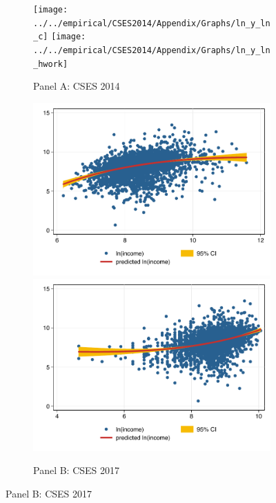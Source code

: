 \documentclass[11pt,letterpaper]{article}
\begin{document}
\begin{figure}[H]
	\caption{Scatter plot of the logarithm of household income ($log(Y_{i})$)}
	
	
	\label{fig:3}
	\begin{subfigure}[b]{0.33\linewidth}
		\caption*{Panel A: CSES 2014} \vspace{-.5em}
		\label{fig:3a}
		\texttt{[image: ../../empirical/CSES2014/Appendix/Graphs/ln\_y\_ln\_c]} 
		\vspace{-2.5em}
		\newline {}
		\texttt{[image: ../../empirical/CSES2014/Appendix/Graphs/ln\_y\_ln\_hwork]} 
		\vspace{-2.5em}
		\newline {}
	\end{subfigure}%
	\hfil
	\begin{subfigure}[b]{0.33\linewidth}
		\caption*{Panel B: CSES 2017} \vspace{-.5em}
		\label{fig:3b}
		\includegraphics[width=1\linewidth]{../../empirical/CSES2017/Appendix/Graphs/ln_y_ln_c} 
		\vspace{-2.5em}
		\newline {}
		\includegraphics[width=1\linewidth]{../../empirical/CSES2017/Appendix/Graphs/ln_y_ln_hwork}

\end{subfigure}
\end{figure}
\end{document}
